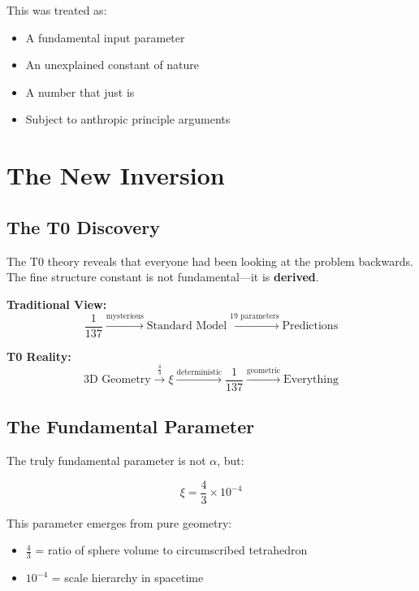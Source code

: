 \documentclass[12pt,a4paper]{article}
\theoremstyle{definition}
\begin{document}
	This was treated as:
	\begin{itemize}
		\item A fundamental input parameter
		\item An unexplained constant of nature
		\item A number that just is
		\item Subject to anthropic principle arguments
	\end{itemize}
	
	\section{The New Inversion}
	
	\subsection{The T0 Discovery}
	
	The T0 theory reveals that everyone had been looking at the problem backwards. The fine structure constant is not fundamental---it is \textbf{derived}.
	
	\begin{newperspective}
		\textbf{Traditional View:}
		\begin{equation}
			\frac{1}{137} \xrightarrow{\text{mysterious}} \text{Standard Model} \xrightarrow{\text{19 parameters}} \text{Predictions}
		\end{equation}
		
		\textbf{T0 Reality:}
		\begin{equation}
			\text{3D Geometry} \xrightarrow{\frac{4}{3}} \xi \xrightarrow{\text{deterministic}} \frac{1}{137} \xrightarrow{\text{geometric}} \text{Everything}
		\end{equation}
	\end{newperspective}
	
	\subsection{The Fundamental Parameter}
	
	The truly fundamental parameter is not $\alpha$, but:
	
	\begin{equation}
		\boxed{\xi = \frac{4}{3} \times 10^{-4}}
	\end{equation}
	
	This parameter emerges from pure geometry:
	\begin{itemize}
		\item $\frac{4}{3}$ = ratio of sphere volume to circumscribed tetrahedron
		\item $10^{-4}$ = scale hierarchy in spacetime
	\end{itemize}
	
\end{document}
